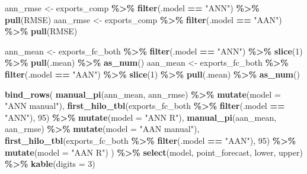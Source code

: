 \documentclass[
  11pt,
]{article}
\newenvironment{Shaded}{\begin{snugshade}}{\end{snugshade}}
\newcommand{\AttributeTok}[1]{\textcolor[rgb]{0.13,0.29,0.53}{#1}}
\newcommand{\DecValTok}[1]{\textcolor[rgb]{0.00,0.00,0.81}{#1}}
\newcommand{\FunctionTok}[1]{\textcolor[rgb]{0.13,0.29,0.53}{\textbf{#1}}}
\newcommand{\NormalTok}[1]{#1}
\newcommand{\OtherTok}[1]{\textcolor[rgb]{0.56,0.35,0.01}{#1}}
\newcommand{\SpecialCharTok}[1]{\textcolor[rgb]{0.81,0.36,0.00}{\textbf{#1}}}
\newcommand{\StringTok}[1]{\textcolor[rgb]{0.31,0.60,0.02}{#1}}
\begin{document}
\begin{Shaded}
\begin{Highlighting}[]
\NormalTok{ann\_rmse }\OtherTok{\textless{}{-}}\NormalTok{ exports\_comp }\SpecialCharTok{\%\textgreater{}\%} \FunctionTok{filter}\NormalTok{(.model }\SpecialCharTok{==} \StringTok{"ANN"}\NormalTok{) }\SpecialCharTok{\%\textgreater{}\%} \FunctionTok{pull}\NormalTok{(RMSE)}
\NormalTok{aan\_rmse }\OtherTok{\textless{}{-}}\NormalTok{ exports\_comp }\SpecialCharTok{\%\textgreater{}\%} \FunctionTok{filter}\NormalTok{(.model }\SpecialCharTok{==} \StringTok{"AAN"}\NormalTok{) }\SpecialCharTok{\%\textgreater{}\%} \FunctionTok{pull}\NormalTok{(RMSE)}

\NormalTok{ann\_mean }\OtherTok{\textless{}{-}}\NormalTok{ exports\_fc\_both }\SpecialCharTok{\%\textgreater{}\%} \FunctionTok{filter}\NormalTok{(.model }\SpecialCharTok{==} \StringTok{"ANN"}\NormalTok{) }\SpecialCharTok{\%\textgreater{}\%} \FunctionTok{slice}\NormalTok{(}\DecValTok{1}\NormalTok{) }\SpecialCharTok{\%\textgreater{}\%} \FunctionTok{pull}\NormalTok{(.mean) }\SpecialCharTok{\%\textgreater{}\%} \FunctionTok{as\_num}\NormalTok{()}
\NormalTok{aan\_mean }\OtherTok{\textless{}{-}}\NormalTok{ exports\_fc\_both }\SpecialCharTok{\%\textgreater{}\%} \FunctionTok{filter}\NormalTok{(.model }\SpecialCharTok{==} \StringTok{"AAN"}\NormalTok{) }\SpecialCharTok{\%\textgreater{}\%} \FunctionTok{slice}\NormalTok{(}\DecValTok{1}\NormalTok{) }\SpecialCharTok{\%\textgreater{}\%} \FunctionTok{pull}\NormalTok{(.mean) }\SpecialCharTok{\%\textgreater{}\%} \FunctionTok{as\_num}\NormalTok{()}

\FunctionTok{bind\_rows}\NormalTok{(}
  \FunctionTok{manual\_pi}\NormalTok{(ann\_mean, ann\_rmse) }\SpecialCharTok{\%\textgreater{}\%} \FunctionTok{mutate}\NormalTok{(}\AttributeTok{model =} \StringTok{"ANN manual"}\NormalTok{),}
  \FunctionTok{first\_hilo\_tbl}\NormalTok{(exports\_fc\_both }\SpecialCharTok{\%\textgreater{}\%} \FunctionTok{filter}\NormalTok{(.model }\SpecialCharTok{==} \StringTok{"ANN"}\NormalTok{), }\DecValTok{95}\NormalTok{) }\SpecialCharTok{\%\textgreater{}\%} \FunctionTok{mutate}\NormalTok{(}\AttributeTok{model =} \StringTok{"ANN R"}\NormalTok{),}
  \FunctionTok{manual\_pi}\NormalTok{(aan\_mean, aan\_rmse) }\SpecialCharTok{\%\textgreater{}\%} \FunctionTok{mutate}\NormalTok{(}\AttributeTok{model =} \StringTok{"AAN manual"}\NormalTok{),}
  \FunctionTok{first\_hilo\_tbl}\NormalTok{(exports\_fc\_both }\SpecialCharTok{\%\textgreater{}\%} \FunctionTok{filter}\NormalTok{(.model }\SpecialCharTok{==} \StringTok{"AAN"}\NormalTok{), }\DecValTok{95}\NormalTok{) }\SpecialCharTok{\%\textgreater{}\%} \FunctionTok{mutate}\NormalTok{(}\AttributeTok{model =} \StringTok{"AAN R"}\NormalTok{)}
\NormalTok{) }\SpecialCharTok{\%\textgreater{}\%}
  \FunctionTok{select}\NormalTok{(model, point\_forecast, lower, upper) }\SpecialCharTok{\%\textgreater{}\%}
  \FunctionTok{kable}\NormalTok{(}\AttributeTok{digits =} \DecValTok{3}\NormalTok{)}
\end{Highlighting}
\end{Shaded}
\end{document}
